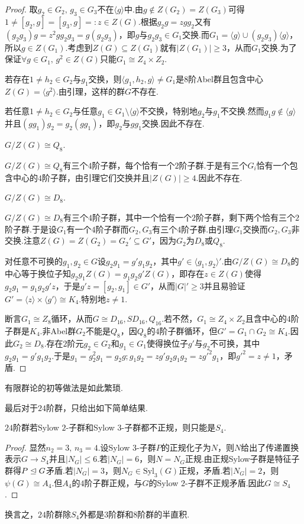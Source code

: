 \begin{proof}
	取$g_2\in G_2,\,g_3\in G_3$不在$\langle g\rangle $中.由$g\notin Z(G_2)=Z(G_3)$可得$1\ne[g_2,g]=[g_3,g]=:z\in Z(G)$.根据$g_2g=zgg_2$又有$(g_2g_3)g=z^2gg_2g_3=g(g_2g_3)$，即$g$与$g_2g_3\in G_1$交换.而$G_1=\langle g\rangle\cup(g_2g_3)\langle g\rangle $，所以$g\in Z(G_1)$.考虑到$Z(G)\subseteq Z(G_1)$就有$|Z(G_1)|\ge 3$，从而$G_1$交换.为了保证$\forall g\in G_1,\,g^2\in Z(G)$只能$G_1\cong Z_4\times Z_2$.

	若存在$1\ne h_2\in G_2$与$g_1$交换，则$\langle g_1,h_2,g\rangle\ne G_1$是$8$阶Abel群且包含中心$Z(G)=\langle g^2\rangle $.由引理，这样的群$G$不存在.

	若任意$1\ne h_2\in G_2$与任意$g_1\in G_1\setminus\langle g\rangle $不交换，特别地$g_2$与$g_1$不交换.然而$g_1g\notin\langle g\rangle $并且$(gg_1)g_2=g_2(gg_1)$，即$g_2$与$gg_1$交换.因此不存在.

	{\color{IndianRed}\bullet$G/Z(G)\cong Q_8$}.

	$G/Z(G)\cong Q_8$有三个$4$阶子群，每个恰有一个$2$阶子群.于是有三个$G_i$恰有一个包含中心的$4$阶子群，由引理它们交换并且$|Z(G)|\ge 4$.因此不存在.

	{\color{IndianRed}\bullet$G/Z(G)\cong D_8$}.

	$G/Z(G)\cong D_8$有三个$4$阶子群，其中一个恰有一个$2$阶子群，剩下两个恰有三个$2$阶子群.于是设$G_1$有一个$4$阶子群而$G_2,G_3$有三个$4$阶子群.由引理$G_1$交换而$G_2,G_3$非交换.注意$Z(G)=Z(G_2)=G_2'\subseteq G'$，因为$G_2$为$D_8$或$Q_8$.

	对任意不可换的$g_1,g_2\in G$设$g_2g_1=g'g_1g_2$，其中$g'\in\langle g_1,g_2\rangle'$.由$G/Z(G)\cong D_8$的中心等于换位子知$g_2g_1Z(G)=g_1g_2g'Z(G)$，即存在$z\in Z(G)$使得$g_2g_1=g_1g_2g'z$，于是$g'z=[g_2,g_1]\in G'$，从而$|G|'\ge 3$并且易验证$G'=\langle z\rangle\times\langle g'\rangle\cong K_4$.特别地$z\ne 1$.

	断言$G_1\cong Z_8$循环，从而$G\cong D_{16},SD_{16},Q_{16}$.若不然，$G_1\cong Z_4\times Z_2$且含中心的$4$阶子群是$K_4$.非Abel群$G_2$不能是$Q_8$，因$Q_8$的$4$阶子群循环，但$G'=G_1\cap G_2\cong K_4$.因此$G_2\cong D_8$.存在$2$阶元$g_2\in G_2$和$g_1\in G_1$使得换位子$g'$与$g_2$不可换，其中$g_2g_1=g'g_1g_2$.于是$g_1=g_2^2g_1=g_2g;g_1g_2=zg'g_2g_1g_2=zg'^2g_1$，即$g'^2=z\ne 1$，矛盾.
\end{proof}
\begin{remark}
	有限群论的初等做法是如此繁琐.
\end{remark}

最后对于$24$阶群，只给出如下简单结果.
\begin{prop}
	$24$阶群若Sylow $2$-子群和Sylow $3$-子群都不正规，则只能是$S_4$.\hypertarget{prop:24OrderGroup}{}
\end{prop}
\begin{proof}
	显然$n_2=3,\,n_3=4$.设Sylow $3$-子群$P$的正规化子为$N$，则$N$给出了传递置换表示$G\to S_4$并且$|N_G|\le 6$.若$|N_G|=6$，则$N=N_G$正规.由正规Sylow子群是特征子群得$P\trianglelefteq G$矛盾.若$|N_G|=3$，则$N_G\in\mathrm{Syl}_3(G)$正规，矛盾.若$|N_G|=2$，则$\psi(G)\cong A_4$.但$A_4$的$4$阶子群正规，与$G$的Sylow $2$-子群不正规矛盾.因此$G\cong S_4$.
\end{proof}
\begin{remark}
	换言之，$24$阶群除$S_4$外都是$3$阶群和$8$阶群的半直积.
\end{remark}
